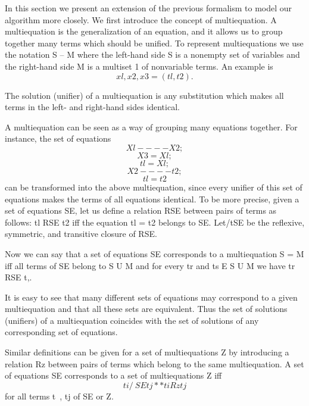 
In this section we present an extension of the previous formalism to model our
algorithm more closely. We first introduce the concept of multiequation. A multiequation
is the generalization of an equation, and it allows us to group together
many terms which should be unified. To represent multiequations we use the
notation S -- M where the left-hand side S is a nonempty set of variables and the
right-hand side M is a multiset 1 of nonvariable terms. An example is
\[{xl, x2, x3} = (tl, t2).\]

The solution (unifier) of a multiequation is any substitution which makes all
terms in the left- and right-hand sides identical. 

A multiequation can be seen as a way of grouping many equations together.
For instance, the set of equations
\[Xl ---- X2;\]
\[X3 = Xl;\]
\[tl = Xl;\]
\[X2 ---- t2;\]
\[tl = t2\]
can be transformed into the above multiequation, since every unifier of this set
of equations makes the terms of all equations identical. To be more precise, given
a set of equations SE, let us define a relation RSE between pairs of terms as
follows: tl RSE t2 iff the equation tl = t2 belongs to SE. Let/tSE be the reflexive,
symmetric, and transitive closure of RSE. 

Now we can say that a set of equations SE corresponds to a multiequation
S = M iff all terms of SE belong to S U M and for every tr and ts E S U M we have
tr RSE t,. 

It is easy to see that many different sets of equations may correspond to a
given multiequation and that all these sets are equivalent. Thus the set of
solutions (unifiers) of a multiequation coincides with the set of solutions of any
corresponding set of equations. 

Similar definitions can be given for a set of multiequations Z by introducing a
relation Rz between pairs of terms which belong to the same multiequation. A set
of equations SE corresponds to a set of multiequations Z iff
\[ti/~SE tj ** ti Rz tj\]
for all terms t~, tj of SE or Z.  
 